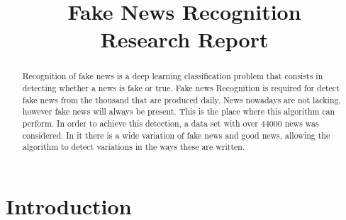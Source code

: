 \documentclass[conference]{IEEEtran}
\begin{document}
\title{Fake News Recognition\\
Research Report}


\author{
\and
{}
}

\maketitle

\thispagestyle{plain}
\pagestyle{plain}

\begin{abstract}

Recognition of fake news is a deep learning classification problem that consists in detecting whether a news is fake or true. Fake news Recognition is required for detect fake news from the thousand that are produced daily. News nowadays are not lacking, however fake news will always be present. This is the place where this algorithm can perform. In order to achieve this detection, a data set with over 44000 news was considered. In it there is a wide variation of fake news and good news, allowing the algorithm to detect variations in the ways these are written.

\end{abstract}

\section{Introduction}
\end{document}
